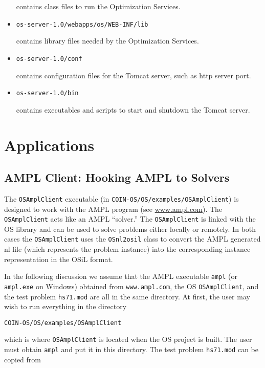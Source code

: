 \documentclass[11pt]{article}
\renewcommand{\_}{{\char"5F}}
\renewcommand{\{}{{\char"7B}}
\renewcommand{\}}{{\char"7D}}
\renewcommand{\^}{{\char"0D}}
\renewcommand{\'}{{\char"0D}}
\begin{document}
\begin{itemize}
contains class files to run the Optimization Services.
\item
\begin{verbatim}
os-server-1.0/webapps/os/WEB-INF/lib
\end{verbatim}
contains library files needed by the Optimization Services.
\item
\begin{verbatim}
os-server-1.0/conf
\end{verbatim}
contains configuration files for the Tomcat server, such as http server port.
\item
\begin{verbatim}
os-server-1.0/bin
\end{verbatim}
contains executables and scripts to start and shutdown the Tomcat server.
\end{itemize}


\section{Applications}\label{section:applications}



\subsection{AMPL Client:  Hooking AMPL to Solvers}\label{section:amplclient}

The {\tt OSAmplClient} executable (in {\tt COIN-OS/OS/examples/OSAmplClient}) is designed to work with the AMPL program (see \url{www.ampl.com}). The {\tt OSAmplClient} acts like an AMPL ``solver.'' The {\tt OSAmplClient} is linked with the OS library and can be used to solve problems either locally or remotely. In both cases the {\tt OSAmplClient} uses the {\tt OSnl2osil} class to convert the AMPL generated nl file (which represents the problem instance) into the corresponding instance representation in the OSiL format.

In the following discussion we assume that the AMPL executable {\tt ampl}  (or {\tt ampl.exe} on Windows) obtained from {\tt www.ampl.com}, the OS {\tt OSAmplClient}, and the test problem {\tt hs71.mod} are all in the same directory. At first, the user may wish to run everything in the directory

\begin{verbatim}
COIN-OS/OS/examples/OSAmplClient
\end{verbatim}
which is where {\tt OSAmplClient} is located when the OS project is built. The user must obtain {\tt ampl} and put it in this directory.  The test problem {\tt hs71.mod} can be copied from
\end{document}
